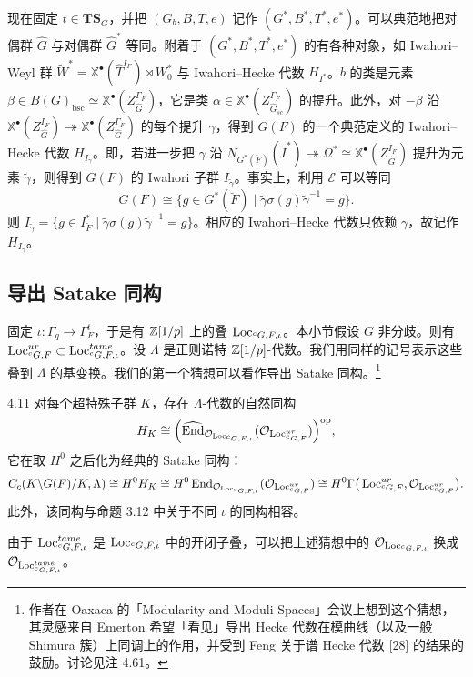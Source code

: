 现在固定 $t\in\mathbf{TS}_G$，并把 $(G_b,B,T,e)$ 记作 $(G^*,B^*,T^*,e^*)$。可以典范地把对偶群 $\hat G$ 与对偶群 $\hat G^*$ 等同。附着于 $(G^*,B^*,T^*,e^*)$ 的有各种对象，如 Iwahori–Weyl 群 $\widetilde W^*=\mathbb{X}^\bullet(\hat T^{I_F})\rtimes W_0^*$ 与 Iwahori–Hecke 代数 $H_{I^*}$。$b$ 的类是元素 $\beta\in B(G)_{\mathrm{bsc}}\simeq\mathbb{X}^\bullet(Z_{\hat G}^{\Gamma_F})$，它是类 $\alpha\in\mathbb{X}^\bullet(Z_{\hat G_{sc}}^{\Gamma_F})$ 的提升。此外，对 $-\beta$ 沿 $\mathbb{X}^\bullet(Z_{\hat G}^{I_F})\twoheadrightarrow\mathbb{X}^\bullet(Z_{\hat G}^{\Gamma_F})$ 的每个提升 $\gamma$，得到 $G(F)$ 的一个典范定义的 Iwahori–Hecke 代数 $H_{I_\gamma}$。即，若进一步把 $\gamma$ 沿 $N_{G^*(\breve F)}(\breve I^*)\twoheadrightarrow\Omega^*\cong\mathbb{X}^\bullet(Z_{\hat G}^{I_F})$ 提升为元素 $\tilde\gamma$，则得到 $G(F)$ 的 Iwahori 子群 $I_{\tilde\gamma}$。事实上，利用 $\mathcal{E}$ 可以等同
\[
G(F)\cong\{g\in G^*(\breve F)\mid\tilde\gamma\sigma(g)\tilde\gamma^{-1}=g\}.
\]
则 $I_{\tilde\gamma}=\{g\in I^*_{\breve F}\mid\tilde\gamma\sigma(g)\tilde\gamma^{-1}=g\}$。相应的 Iwahori–Hecke 代数只依赖 $\gamma$，故记作 $H_{I_\gamma}$。

\subsection{导出 Satake 同构}
固定 $\iota:\Gamma_q\to\Gamma_F^t$，于是有 $\mathbb{Z}[1/p]$ 上的叠 $\operatorname{Loc}_{{}^cG,F,\iota}$。本小节假设 $G$ 非分歧。则有 $\operatorname{Loc}^{ur}_{{}^cG,F}\subset\operatorname{Loc}^{tame}_{{}^cG,F,\iota}$。设 $\Lambda$ 是正则诺特 $\mathbb{Z}[1/p]$-代数。我们用同样的记号表示这些叠到 $\Lambda$ 的基变换。我们的第一个猜想可以看作导出 Satake 同构。\footnote{作者在 Oaxaca 的「Modularity and Moduli Spaces」会议上想到这个猜想，其灵感来自 Emerton 希望「看见」导出 Hecke 代数在模曲线（以及一般 Shimura 簇）上同调上的作用，并受到 Feng 关于谱 Hecke 代数 [28] 的结果的鼓励。讨论见注 4.61。}

\begin{conj}{4.11}
对每个超特殊子群 $K$，存在 $\Lambda$-代数的自然同构
\[
H_K\cong\Big(\widehat{\operatorname{End}}_{\mathcal{O}_{\operatorname{Loc}_{{}^cG,F,\iota}}}(\mathcal{O}_{\operatorname{Loc}^{ur}_{{}^cG,F}})\Big)^{\mathrm{op}},
\]
它在取 $H^0$ 之后化为经典的 Satake 同构：
\[
C_c(K\backslash G(F)/K,\Lambda)\cong H^0H_K\cong H^0\operatorname{End}_{\mathcal{O}_{\operatorname{Loc}_{{}^cG,F,\iota}}}(\mathcal{O}_{\operatorname{Loc}^{ur}_{{}^cG,F}})
\cong H^0\Gamma\big(\operatorname{Loc}^{ur}_{{}^cG,F},\mathcal{O}_{\operatorname{Loc}^{ur}_{{}^cG,F}}\big).
\]
此外，该同构与命题 3.12 中关于不同 $\iota$ 的同构相容。
\end{conj}

由于 $\operatorname{Loc}^{tame}_{{}^cG,F,\iota}$ 是 $\operatorname{Loc}_{{}^cG,F,\iota}$ 中的开闭子叠，可以把上述猜想中的 $\mathcal{O}_{\operatorname{Loc}_{{}^cG,F,\iota}}$ 换成 $\mathcal{O}_{\operatorname{Loc}^{tame}_{{}^cG,F,\iota}}$。

